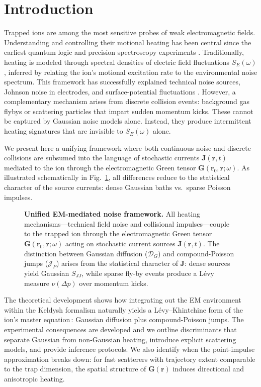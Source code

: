 
\section{Introduction}
Trapped ions are among the most sensitive probes of weak electromagnetic fields. 
Understanding and controlling their motional heating has been central since the earliest quantum logic and precision spectroscopy experiments \cite{Turchette2000,Wineland1998}. 
Traditionally, heating is modeled through spectral densities of electric field fluctuations $S_E(\omega)$, inferred by relating the ion's motional excitation rate to the environmental noise spectrum. 
This framework has successfully explained technical noise sources, Johnson noise in electrodes, and surface-potential fluctuations \cite{Brownnutt2015}. However, a complementary mechanism arises from discrete collision events: background gas flybys or scattering particles that impart sudden momentum kicks. 
These cannot be captured by Gaussian noise models alone. 
Instead, they produce intermittent heating signatures that are invisible to $S_E(\omega)$ alone.

We present here a unifying framework where both continuous noise and discrete collisions are subsumed into the language of stochastic currents $\mathbf{J}(\mathbf{r},t)$ mediated to the ion through the electromagnetic Green tensor $\mathbf{G}(\mathbf{r}_0,\mathbf{r};\omega)$. 
As illustrated schematically in Fig.~\ref{fig:em_mediation}, all differences reduce to the statistical character of the source currents: dense Gaussian baths vs.~sparse Poisson impulses.
%
\begin{figure}[t]
\centering

\caption{%
\textbf{Unified EM-mediated noise framework.}
All heating mechanisms—technical field noise and collisional impulses—couple to the trapped ion through the electromagnetic Green tensor $\mathbf{G}(\mathbf{r}_0,\mathbf{r};\omega)$ acting on stochastic current sources $\mathbf{J}(\mathbf{r},t)$. 
The distinction between Gaussian diffusion ($\mathcal{D}_G$) and compound-Poisson jumps ($\mathcal{J}_P$) arises from the statistical character of $\mathbf{J}$: dense sources yield Gaussian $S_{JJ}$, while sparse fly-by events produce a L\'evy measure $\nu(\Delta p)$ over momentum kicks.}
\label{fig:em_mediation}
\end{figure}
%
The theoretical development shows how integrating out the EM environment within the Keldysh formalism naturally yields a L\'evy--Khintchine form of the ion's master equation\,\cite{Sornette2006}: Gaussian diffusion plus compound-Poisson jumps. 
The experimental consequences are developed and we outline discriminants that separate Gaussian from non-Gaussian heating, introduce explicit scattering models, and provide inference protocols.
We also identify when the point-impulse approximation breaks down: for fast scatterers with trajectory extent comparable to the trap dimension, the spatial structure of $\mathbf{G}(\mathbf{r})$ induces directional and anisotropic heating. 
